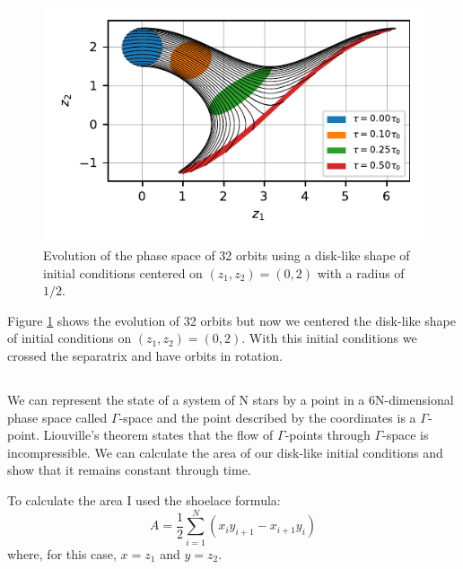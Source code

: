 \begin{figure}
    \centering
    \includegraphics{CodeAndFigures/PendulumPhaseSpaceUs2f.pdf}
    \caption{Evolution of the phase space of 32 orbits using a disk-like shape of initial conditions centered on $(z_1,z_2)=(0,2)$ with a radius of $1/2$.}
    \label{fig:pend2f}
\end{figure}

Figure \ref{fig:pend2f} shows the evolution of 32 orbits but now we centered the disk-like shape of initial conditions on  $(z_1,z_2)=(0,2)$. With this initial conditions we crossed the separatrix and have orbits in rotation.  

\subsection{}
We can represent the state of a system of N stars by a point in a 6N-dimensional phase space called $\Gamma$-space and the point described by the coordinates is a $\Gamma$-point.  
Liouville’s theorem states that the flow of $\Gamma$-points through $\Gamma$-space is incompressible. We can calculate the area of our disk-like initial conditions and show that it remains constant through time.

To calculate the area I used the shoelace formula:
\begin{equation}
    A=\frac{1}{2}\sum_{i=1}^N\left(x_{i}y_{i+1}-x_{i+1}y_{i}\right)
\end{equation}
where, for this case, $x=z_1$ and $y=z_2$. 


